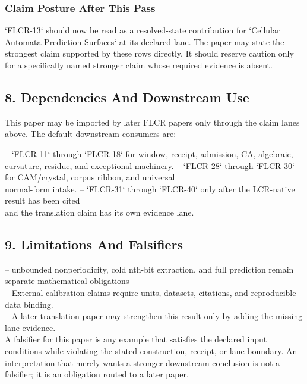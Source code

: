 \documentclass[11pt]{article}
\begin{document}
\subsubsection*{Claim Posture After This Pass}

`FLCR-13` should now be read as a resolved-state contribution for `Cellular Automata Prediction Surfaces` at its declared lane. The paper may state the strongest claim supported by these rows directly. It should reserve caution only for a specifically named stronger claim whose required evidence is absent.

\subsection*{8. Dependencies And Downstream Use}

This paper may be imported by later FLCR papers only through the claim lanes
above. The default downstream consumers are:

\noindent{}-- `FLCR-11` through `FLCR-18` for window, receipt, admission, CA, algebraic,\\
  curvature, residue, and exceptional machinery.
\noindent{}-- `FLCR-28` through `FLCR-30` for CAM/crystal, corpus ribbon, and universal\\
  normal-form intake.
\noindent{}-- `FLCR-31` through `FLCR-40` only after the LCR-native result has been cited\\
  and the translation claim has its own evidence lane.

\subsection*{9. Limitations And Falsifiers}

\noindent{}-- unbounded nonperiodicity, cold nth-bit extraction, and full prediction remain separate mathematical obligations\\
\noindent{}-- External calibration claims require units, datasets, citations, and reproducible data binding.\\
\noindent{}-- A later translation paper may strengthen this result only by adding the missing lane evidence.\\

A falsifier for this paper is any example that satisfies the declared input
conditions while violating the stated construction, receipt, or lane boundary.
An interpretation that merely wants a stronger downstream conclusion is not a
falsifier; it is an obligation routed to a later paper.
\end{document}
